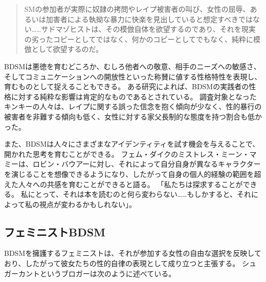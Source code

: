 \documentclass[paper=a4,book,openany]{jlreq}
\begin{document}
\begin{quote}
  SMの参加者が実際に奴隷の拷問やレイプ被害者の叫び、女性の屈辱、あるいは加害者による執拗な暴力に快楽を見出していると想定すべきではない……サドマゾヒストは、その模倣自体を欲望するのであり、それを現実の劣ったコピーとしてではなく、何かのコピーとしてでもなく、純粋に模倣として欲望するのだ。
\citep[p.125]{hopkins94:_rethin_sadom}

\end{quote}

BDSMは悪徳を育むどころか、むしろ他者への敬意、相手のニーズへの敏感さ、そしてコミュニケーションへの開放性といった称賛に値する性格特性を表現し、育むものとして捉えることもできる。
ある研究によれば、BDSMの実践者の性格に対する純粋な影響は肯定的なものであるとされている。
調査対象となったキンキーの人々は、レイプに関する誤った信念を抱く傾向が少なく、性的暴行の被害者を非難する傾向も低く、女性に対する家父長制的な態度を持つ割合も低かった\citep[p.1]{klement16:_partic_cultur_consen_may_be}。

また、BDSMは人々にさまざまなアイデンティティを試す機会を与えることで、開かれた思考を育むことができる。
フェム・ダイクのミストレス・ミーン・マミーは、ロビン・バウアーに対し、それによって自分自身が異なるキャラクターを演じることを想像できるようになり、したがって自身の個人的経験の範囲を超えた人々への共感を育むことができると語る。
「私たちは探求することができる。
私にとって、それは本を読むのと何ら変わらない……もしかすると、それによって私の視点が変わるかもしれない」\citep[p.141]{bauer18:_bois_grrrl_meet_their_daddies}。

\subsection{フェミニストBDSM}

BDSMを擁護するフェミニストは、それが参加する女性の自由な選択を反映しており、したがって彼女たちの性的自律の表現として成り立つと主張する。
シュガーカントというブロガーは次のように述べている。
\end{document}
